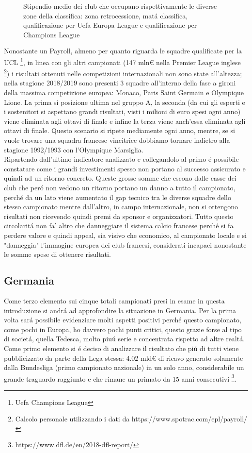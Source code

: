 \documentclass[
    corpo=11.5pt,
    oneside,
    evenboxes,
    tipotesi=triennale,
    stile=classica,
    oldstyle,
    autoretitolo,
    greek,
]{toptesi}
\begin{document}
\begin{interlinea}{1.5}
\begin{figure}
    \caption{Stipendio medio dei club che occupano rispettivamente le diverse zone della classifica: zona retrocessione, 
    mat\'a classifica, qualificazione per Uefa Europa League e qualificazione per Champions League}
    \label{stipendi_ligue1}
\end{figure}

Nonostante un Payroll, almeno per quanto riguarda le squadre qualificate per la UCL \footnote{Uefa Champions League}, in linea con gli
altri campionati (147 mln€ nella Premier League inglese \footnote{Calcolo personale utilizzando i dati da https://www.spotrac.com/epl/payroll/})
i risultati ottenuti nelle competizioni internazionali non sono state all'altezza; nella stagione 2018/2019 sono presenti 3 squadre 
all'interno della fase a gironi della massima competizione europea: Monaco, Paris Saint Germain e Olympique Lione. La prima si 
posizione ultima nel gruppo A, la seconda (da cui gli esperti e i sostenitori si aspettano grandi risultati, visti i milioni di euro 
spesi ogni anno) viene eliminata agli ottavi di finale e infine la terza viene anch'essa eliminata agli ottavi di finale. Questo scenario
si ripete mediamente ogni anno, mentre, se si vuole trovare una squadra francese vincitrice dobbiamo tornare indietro alla stagione 1992/1993
con l'Olympique Marsiglia.\\
Ripartendo dall'ultimo indicatore analizzato e collegandolo al primo \'e possibile constatare come i grandi investimenti spesso non portano 
al successo assicurato e quindi ad un ritorno concreto. Queste grosse somme che escono dalle casse dei club che per\'o
non vedono un ritorno portano un danno a tutto il campionato, perch\'e da un lato viene aumentato il gap tecnico tra le diverse squadre dello
stesso campionato mentre dall'altro, in campo internazionale, non si ottengono risultati non ricevendo quindi premi da sponsor e organizzatori.
Tutto questo circolarit\'a non fa' altro che danneggiare il sistema calcio francese perch\'e si fa perdere valore e quindi appeal, sia 
visivo che economico, al campionato locale e si "danneggia" l'immagine europea dei club francesi, considerati incapaci nonostante le somme spese
di ottenere risultati.

\subsection{Germania}
Come terzo elemento sui cinque totali campionati presi in esame in questa introduzione si andr\'a ad approfondire la situazione
in Germania. Per la prima volta sar\'a possibile evidenziare molti aspetti positivi perch\'e questo campionato, come pochi in Europa,
ho davvero pochi punti critici, questo grazie forse al tipo di societ\'a, quella Tedesca, molto piu\'u serie e concentrata rispetto
ad altre realt\'a.\\
Come primo elemento si \'e deciso di analizzare il risultato che pi\'u di tutti viene pubblicizzato da parte della Lega stessa: 
4.02 mld€ di ricavo generato solamente dalla Bundesliga (primo campionato nazionale) in un solo anno,
considerabile un grande traguardo raggiunto e che rimane un primato da 15 anni consecutivi
\footnote{https://www.dfl.de/en/2018-dfl-report/}.


\end{interlinea}
\end{document}
